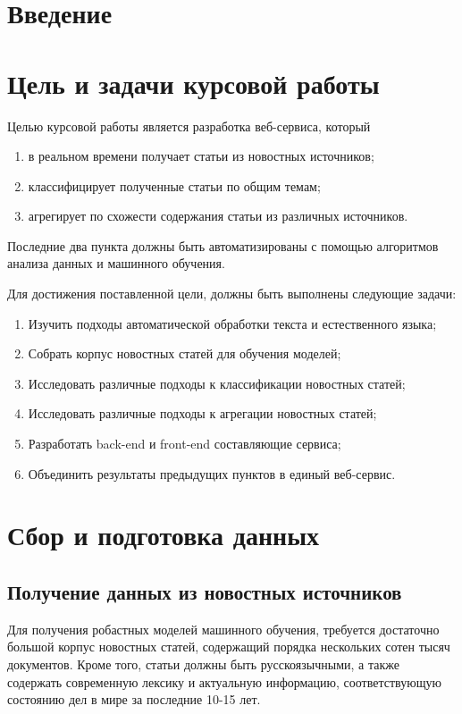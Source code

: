\documentclass[a4paper, 14pt]{extarticle}
\begin{document}
\section{Введение}
\section{Цель и задачи курсовой работы}
Целью курсовой работы является разработка веб-сервиса, который
\begin{enumerate}
	\item в реальном времени получает статьи из новостных источников;
	\item классифицирует полученные статьи по общим темам;
	\item агрегирует по схожести содержания статьи из различных источников.
\end{enumerate}
Последние два пункта должны быть автоматизированы с помощью алгоритмов анализа данных и машинного обучения.

Для достижения поставленной цели, должны быть выполнены следующие задачи:
\begin{enumerate}
	\item Изучить подходы автоматической обработки текста и естественного языка;
	\item Собрать корпус новостных статей для обучения моделей;
	\item Исследовать различные подходы к классификации новостных статей;
	\item Исследовать различные подходы к агрегации новостных статей;
	\item Разработать back-end и front-end составляющие сервиса;
	\item Объединить результаты предыдущих пунктов в единый веб-сервис.
\end{enumerate}
\section{Сбор и подготовка данных}
\subsection{Получение данных из новостных источников}
Для получения робастных моделей машинного обучения, требуется достаточно большой корпус новостных статей,
содержащий порядка нескольких сотен тысяч документов. Кроме того, статьи должны быть русскоязычными, а также
содержать современную лексику и актуальную информацию, соответствующую состоянию дел в мире за последние 10-15 лет.
\end{document}
